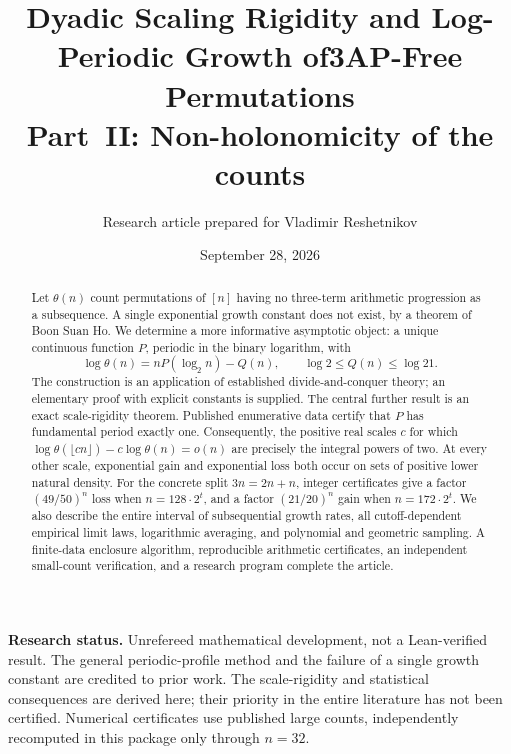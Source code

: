 \documentclass[11pt,a4paper]{article}
\title{\bfseries Dyadic Scaling Rigidity and\newline
Log-Periodic Growth of\newline 3AP-Free Permutations\\[4pt]
\large\mdseries Part~II: Non-holonomicity of the counts}
\author{Research article prepared for Vladimir Reshetnikov}
\date{September 28, 2026}
\numberwithin{equation}{section}
\theoremstyle{definition}
\theoremstyle{remark}
\theoremstyle{definition}
\theoremstyle{plain}
\begin{document}
\maketitle
\thispagestyle{empty}
\begin{abstract}
Let $\theta(n)$ count permutations of $[n]$ having no three-term arithmetic
progression as a subsequence. A single exponential growth constant does not
exist, by a theorem of Boon Suan Ho. We determine a more informative asymptotic
object: a unique continuous function $P$, periodic in the binary logarithm,
with
\[
 \log\theta(n)=nP(\log_2 n)-Q(n),\qquad
 \log 2\le Q(n)\le\log 21.
\]
The construction is an application of established divide-and-conquer theory;
an elementary proof with explicit constants is supplied. The central further
result is an exact scale-rigidity theorem. Published enumerative data certify
that $P$ has fundamental period exactly one. Consequently, the positive real
scales $c$ for which
$\log\theta(\lfloor cn\rfloor)-c\log\theta(n)=o(n)$ are precisely the integral
powers of two. At every other scale, exponential gain and exponential loss
both occur on sets of positive lower natural density.
For the concrete split $3n=2n+n$, integer certificates give a factor
$(49/50)^n$ loss when $n=128\cdot2^t$, and a factor $(21/20)^n$ gain when
$n=172\cdot2^t$. We also describe the entire interval of subsequential growth
rates, all cutoff-dependent empirical limit laws, logarithmic averaging,
and polynomial and geometric sampling. A finite-data enclosure algorithm,
reproducible arithmetic certificates, an independent small-count verification,
and a research program complete the article.
\end{abstract}
\vspace{3pt}
\noindent\textbf{Research status.} Unrefereed mathematical development, not a
Lean-verified result. The general periodic-profile method and the failure of a
single growth constant are credited to prior work. The scale-rigidity and
statistical consequences are derived here; their priority in the entire
literature has not been certified. Numerical certificates use published large
counts, independently recomputed in this package only through $n=32$.
\end{document}
